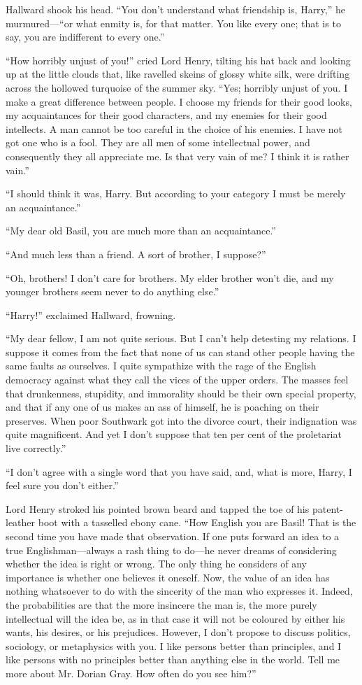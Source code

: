 Hallward shook his head. “You don’t understand what friendship is, Harry,” he murmured—“or what enmity is, for that matter. You like every one; that is to say, you are indifferent to every one.”

“How horribly unjust of you!” cried Lord Henry, tilting his hat back and looking up at the little clouds that, like ravelled skeins of glossy white silk, were drifting across the hollowed turquoise of the summer sky. “Yes; horribly unjust of you. I make a great difference between people. I choose my friends for their good looks, my acquaintances for their good characters, and my enemies for their good intellects. A man cannot be too careful in the choice of his enemies. I have not got one who is a fool. They are all men of some intellectual power, and consequently they all appreciate me. Is that very vain of me? I think it is rather vain.”

“I should think it was, Harry. But according to your category I must be merely an acquaintance.”

“My dear old Basil, you are much more than an acquaintance.”

“And much less than a friend. A sort of brother, I suppose?”

“Oh, brothers! I don’t care for brothers. My elder brother won’t die, and my younger brothers seem never to do anything else.”

“Harry!” exclaimed Hallward, frowning.

“My dear fellow, I am not quite serious. But I can’t help detesting my relations. I suppose it comes from the fact that none of us can stand other people having the same faults as ourselves. I quite sympathize with the rage of the English democracy against what they call the vices of the upper orders. The masses feel that drunkenness, stupidity, and immorality should be their own special property, and that if any one of us makes an ass of himself, he is poaching on their preserves. When poor Southwark got into the divorce court, their indignation was quite magnificent. And yet I don’t suppose that ten per cent of the proletariat live correctly.”

“I don’t agree with a single word that you have said, and, what is more, Harry, I feel sure you don’t either.”

Lord Henry stroked his pointed brown beard and tapped the toe of his patent-leather boot with a tasselled ebony cane. “How English you are Basil! That is the second time you have made that observation. If one puts forward an idea to a true Englishman—always a rash thing to do—he never dreams of considering whether the idea is right or wrong. The only thing he considers of any importance is whether one believes it oneself. Now, the value of an idea has nothing whatsoever to do with the sincerity of the man who expresses it. Indeed, the probabilities are that the more insincere the man is, the more purely intellectual will the idea be, as in that case it will not be coloured by either his wants, his desires, or his prejudices. However, I don’t propose to discuss politics, sociology, or metaphysics with you. I like persons better than principles, and I like persons with no principles better than anything else in the world. Tell me more about Mr. Dorian Gray. How often do you see him?”

